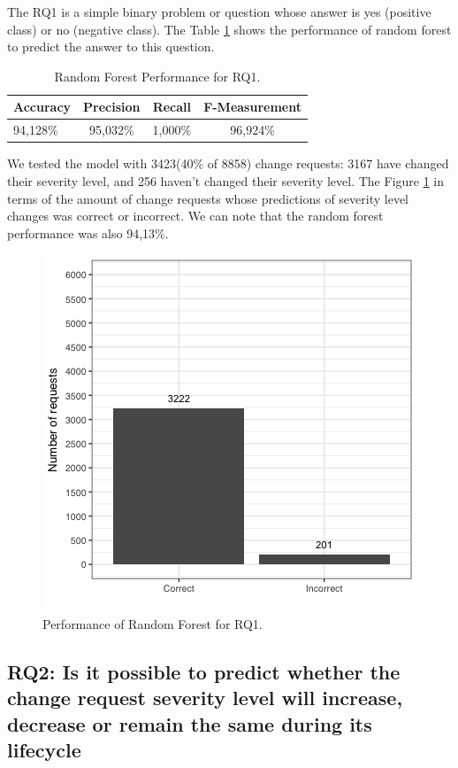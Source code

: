 \documentclass[10pt, conference]{IEEEtran}
\begin{document}
The RQ1 is a simple binary problem or question whose answer is yes (positive class) or no (negative class). The Table \ref{tab:metrics_for_rq1} shows the performance of random forest to predict the answer to this question.

\begin{table}[!ht]
	\renewcommand{\arraystretch}{1.3}
	\caption{Random Forest Performance for RQ1.}
	\label{tab:metrics_for_rq1}
	\centering
	\begin{tabular}{|l|c|c|c|}
		\hline
		Accuracy & Precision & Recall & F-Measurement\\
		\hline
		94,128\% & 95,032\% & 1,000\% & 96,924\%\\
		\hline
	\end{tabular}
\end{table}


We tested the model with 3423(40\% of 8858) change requests: 3167 have changed their severity level, and 256 haven't changed their severity level. The Figure \ref{fig:rf_performance_for_q1} in terms of the amount of change requests whose predictions of severity level changes was correct or incorrect. We can note that the random forest performance was also 94,13\%.

\begin{figure}[!hbt]
  \label{fig:rf_performance_for_q1}
  \includegraphics[scale=0.60]{figures/rf_performance_for_q1.png}
  \caption{Performance of Random Forest for RQ1.}
\end{figure}

\subsection{RQ2: Is it possible to predict whether the change request severity level will increase, decrease or remain the same during its lifecycle}
\end{document}
